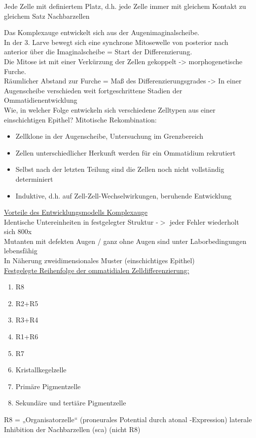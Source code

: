 Jede Zelle mit definiertem Platz, d.h. jede Zelle immer mit gleichem Kontakt zu gleichem Satz Nachbarzellen

Das Komplexauge entwickelt sich aus der Augenimaginalscheibe.\\
In der 3. Larve bewegt sich eine synchrone Mitosewelle von posterior nach anterior über die Imaginalscheibe = Start der Differenzierung.\\
Die Mitose ist mit einer Verkürzung der Zellen gekoppelt -> morphogenetische Furche.\\
Räumlicher Abstand zur Furche = Maß des Differenzierungsgrades -> In einer Augenscheibe verschieden weit fortgeschrittene Stadien der Ommatidienentwicklung\\

Wie, in welcher Folge entwickeln sich verschiedene Zelltypen aus einer einschichtigen Epithel? Mitotische Rekombination:
\begin{itemize}
	\item Zellklone in der Augenscheibe, Untersuchung im Grenzbereich
	\item Zellen unterschiedlicher Herkunft werden für ein Ommatidium rekrutiert
	\item Selbst nach der letzten Teilung sind die Zellen noch nicht vollständig determiniert
	\item Induktive, d.h. auf Zell-Zell-Wechselwirkungen, beruhende Entwicklung
\end{itemize}

\underline{Vorteile des Entwicklungsmodells Komplexauge}\\
Identische Untereinheiten in festgelegter Struktur -$>$ jeder Fehler wiederholt sich 800x\\
Mutanten mit defekten Augen / ganz ohne Augen sind unter Laborbedingungen lebensfähig\\
In Näherung zweidimensionales Muster (einschichtiges Epithel)\\

\underline{Festgelegte Reihenfolge der ommatidialen Zelldifferenzierung:}
\begin{enumerate}
	\item R8
	\item R2+R5
	\item R3+R4
	\item R1+R6
	\item R7
	\item Kristallkegelzelle
	\item Primäre Pigmentzelle
	\item Sekundäre und tertiäre Pigmentzelle
\end{enumerate}
R8 = „Organisatorzelle“ (proneurales Potential durch atonal -Expression) laterale Inhibition der Nachbarzellen (sca) (nicht R8)\\

